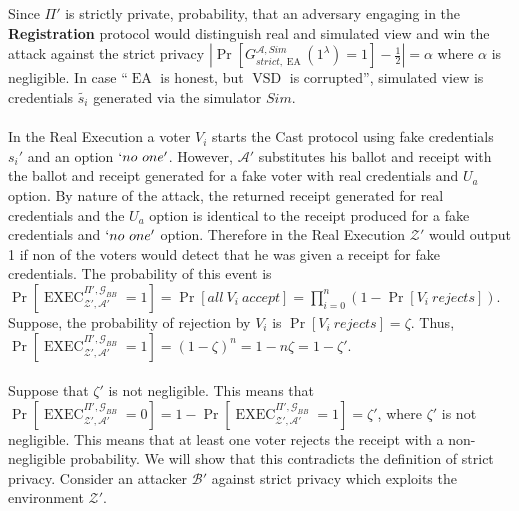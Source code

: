 \documentclass[12pt]{article}
\DeclareMathOperator{\exec}{EXEC}
\DeclareMathOperator{\vsd}{VSD}
\DeclareMathOperator{\ea}{EA}
\def\blockdist{2.3}
\begin{document}
\\\\
Since $\Pi'$ is strictly private, probability, that an adversary engaging in the \textbf{Registration} protocol would distinguish real and simulated view and win the attack against the strict privacy $|\Pr[G_{strict,\ea}^{\mathcal{A},Sim}(1^{\lambda}) = 1] - \frac{1}{2}| = \alpha$ where $\alpha$ is negligible. In case ``$\ea$ is honest, but $\vsd$ is corrupted'', simulated view is credentials $\tilde{s_i}$ generated via the simulator $Sim$. \\\\
In the Real Execution a voter $V_i$ starts the Cast protocol using fake credentials $s_i'$ and an option $`no~one'$. However, $\mathcal{A'}$ substitutes his ballot and receipt with the ballot and receipt generated for a fake voter with real credentials and $U_a$ option. By nature of the attack, the returned receipt generated for real credentials and the $U_a$ option is identical to the receipt produced for a fake credentials and $`no~one'$ option. Therefore in the Real Execution $\mathcal{Z'}$ would output 1 if non of the voters would detect that he was given a receipt for fake credentials. The probability of this event is $\Pr[\exec_{\mathcal{Z'},\mathcal{A'}}^{\Pi', \mathcal{G}_{BB}} = 1] =  \Pr[all~V_i~accept] = \prod_{i=0}^n(1- \Pr[V_i~rejects] )$. Suppose, the probability of rejection by $V_i$ is $ \Pr[V_i~rejects] = \zeta$. Thus,   $\Pr[\exec_{\mathcal{Z'},\mathcal{A'}}^{\Pi', \mathcal{G}_{BB}} = 1] = (1 - \zeta)^n = 1 - n\zeta = 1- \zeta'$.\\\\
Suppose that $ \zeta'$ is not negligible. This means that $\Pr[\exec_{\mathcal{Z'},\mathcal{A'}}^{\Pi', \mathcal{G}_{BB}} = 0] = 1 - \Pr[\exec_{\mathcal{Z'},\mathcal{A'}}^{\Pi', \mathcal{G}_{BB}} = 1] =  \zeta'$, where $ \zeta'$ is not negligible. This means that at least one voter rejects the receipt with a non-negligible probability. We will show that this contradicts the definition of strict privacy. Consider an attacker $\mathcal{B'}$ against strict privacy which exploits the environment  $\mathcal{Z'}$. \\\\
\\\\
\end{document}
